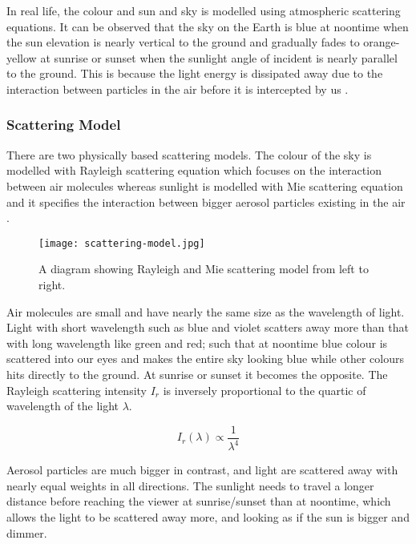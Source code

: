 \documentclass[oneside, a4paper]{report}
\begin{document}
    In real life, the colour and sun and sky is modelled using atmospheric scattering equations. It can be observed that the sky on the Earth is blue at noontime when the sun elevation is nearly vertical to the ground and gradually fades to orange-yellow at sunrise or sunset when the sunlight angle of incident is nearly parallel to the ground. This is because the light energy is dissipated away due to the interaction between particles in the air before it is intercepted by us \cite{atmo_scattering}.

    \subsubsection{Scattering Model}

    There are two physically based scattering models. The colour of the sky is modelled with Rayleigh scattering equation which focuses on the interaction between air molecules whereas sunlight is modelled with Mie scattering equation and it specifies the interaction between bigger aerosol particles existing in the air \cite{atmo_scattering}.

    \begin{figure}[H]
        \center
        \texttt{[image: scattering-model.jpg]}
        \caption{A diagram showing Rayleigh and Mie scattering model from left to right.}
    \end{figure}

    Air molecules are small and have nearly the same size as the wavelength of light. Light with short wavelength such as blue and violet scatters away more than that with long wavelength like green and red; such that at noontime blue colour is scattered into our eyes and makes the entire sky looking blue while other colours hits directly to the ground. At sunrise or sunset it becomes the opposite. The Rayleigh scattering intensity \(I_{r}\) is inversely proportional to the quartic of wavelength of the light \(\lambda\).

    \begin{equation}
        I_{r}(\lambda) \propto \frac{1}{\lambda^{4}}
    \end{equation}

    Aerosol particles are much bigger in contrast, and light are scattered away with nearly equal weights in all directions. The sunlight needs to travel a longer distance before reaching the viewer at sunrise/sunset than at noontime, which allows the light to be scattered away more, and looking as if the sun is bigger and dimmer.
\end{document}
